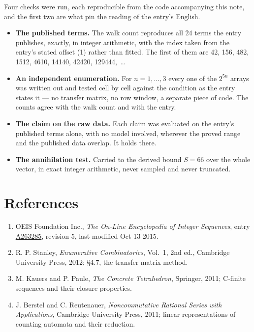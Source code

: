 \documentclass[11pt]{article}
\theoremstyle{definition}
\begin{document}
Four checks were run, each reproducible from the code accompanying this note, and the first two are what pin the reading of the entry's English.

\begin{itemize}

\item {\bfseries The published terms.} The walk count reproduces all 24 terms the entry publishes, exactly, in integer arithmetic, with the index taken from the entry's stated offset (1) rather than fitted. The first of them are 42, 156, 482, 1512, 4610, 14140, 42420, 129444,~\dots

\item {\bfseries An independent enumeration.} For $n = 1,\dots,3$ every one of the $2^{5n}$ arrays was written out and tested cell by cell against the condition as the entry states it --- no transfer matrix, no row window, a separate piece of code. The counts agree with the walk count and with the entry.

\item {\bfseries The claim on the raw data.} Each claim was evaluated on the entry's published terms alone, with no model involved, wherever the proved range and the published data overlap. It holds there.

\item {\bfseries The annihilation test.} Carried to the derived bound $S = 66$ over the whole vector, in exact integer arithmetic, never sampled and never truncated.

\end{itemize}

\section{References}

\begin{enumerate}

\item OEIS Foundation Inc., \emph{The On-Line Encyclopedia of Integer Sequences}, entry \href{https://oeis.org/A263285}{A263285}, revision 5, last modified Oct 13 2015.

\item R. P. Stanley, \emph{Enumerative Combinatorics}, Vol.~1, 2nd ed., Cambridge University Press, 2012; \S4.7, the transfer-matrix method.

\item M. Kauers and P. Paule, \emph{The Concrete Tetrahedron}, Springer, 2011; C-finite sequences and their closure properties.

\item J. Berstel and C. Reutenauer, \emph{Noncommutative Rational Series with Applications}, Cambridge University Press, 2011; linear representations of counting automata and their reduction.

\end{enumerate}
\end{document}

